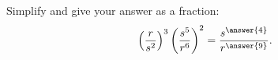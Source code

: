 \documentclass{ximera}
\author{Ivo Terek}
\begin{document}
\begin{exercise}

Simplify and give your answer as a fraction: $$\left(\frac{r}{s^2}\right)^3\left(\frac{s^5}{r^6}\right)^2 = \frac{s^{\answer{4}}}{r^{\answer{9}}}.$$

\end{exercise}
\end{document}
